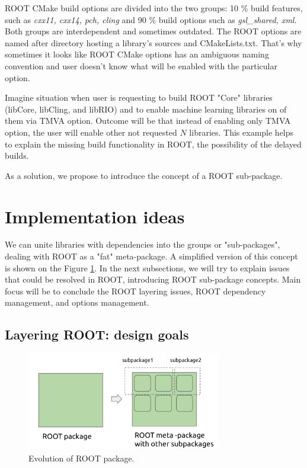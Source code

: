 \documentclass[12pt]{iopart}
\begin{document}
ROOT CMake build options are divided into the two groups: 10 \% build features, such as \textit{cxx11, cxx14, pch, cling} and 90 \% build options such as \textit{gsl\_shared, xml}. Both groups are interdependent and sometimes outdated. The ROOT options are named after directory hosting a library's sources and CMakeLists.txt. That's why sometimes it looks like ROOT CMake options has an ambiguous naming convention and user doesn't know what will be enabled with the particular option. 

Imagine situation when user is requesting to build ROOT "Core" libraries (libCore, libCling, and libRIO) and to enable machine learning libraries on of them via TMVA option. Outcome will be that instead of enabling only TMVA option, the user will enable other not requested $N$ libraries. This example helps to explain the missing build functionality in ROOT, the possibility of the delayed builds.

As a solution, we propose to introduce the concept of a ROOT sub-package.

\section{Implementation ideas}

We can unite libraries with dependencies into the groups or "sub-packages", dealing with ROOT as a "fat" meta-package. A simplified version of this concept is shown on the Figure \ref{subpackage}. In the next subsections, we will try to explain issues that could be resolved in ROOT, introducing ROOT sub-package concepts. Main focus will be to conclude the ROOT layering issues, ROOT dependency management, and options management.

\subsection{Layering ROOT: design goals}

\begin{figure}[!h]
\centering
\includegraphics[width=0.75\textwidth]{root-pm-subpackage.png}
\caption{Evolution of ROOT package.}
\label{subpackage}
\end{figure}
\end{document}
